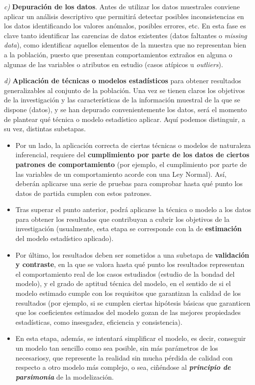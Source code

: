 \documentclass[
]{book}
\begin{document}
\emph{c)} \textbf{Depuración de los datos}. Antes de utilizar los datos muestrales conviene aplicar un análisis descriptivo que permitirá detectar posibles inconsistencias en los datos identificando los valores anómalos, posibles errores, etc. En esta fase es clave tanto identificar las carencias de datos existentes (datos faltantes o \emph{missing data}), como identificar aquellos elementos de la muestra que no representan bien a la población, puesto que presentan comportamientos extraños en alguna o algunas de las variables o atributos en estudio (casos atípicos u \emph{outliers}).

\emph{d)} \textbf{Aplicación de técnicas o modelos estadísticos} para obtener resultados generalizables al conjunto de la población. Una vez se tienen claros los objetivos de la investigación y las características de la información muestral de la que se dispone (datos), y se han depurado convenientemente los datos, será el momento de plantear qué técnica o modelo estadístico aplicar. Aquí podemos distinguir, a su vez, distintas subetapas.

\begin{itemize}
\item
  Por un lado, la aplicación correcta de ciertas técnicas o modelos de naturaleza inferencial, requiere del \textbf{cumplimiento por parte de los datos de ciertos patrones de comportamiento} (por ejemplo, el cumplimiento por parte de las variables de un comportamiento acorde con una Ley Normal). Así, deberán aplicarse una serie de pruebas para comprobar hasta qué punto los datos de partida cumplen con estos patrones.
\item
  Tras superar el punto anterior, podrá aplicarse la técnica o modelo a los datos para obtener los resultados que contribuyan a cubrir los objetivos de la investigación (usualmente, esta etapa se corresponde con la de \textbf{estimación} del modelo estadístico aplicado).
\item
  Por último, los resultados deben ser sometidos a una subetapa de \textbf{validación y contraste}, en la que se valora hasta qué punto los resultados representan el comportamiento real de los casos estudiados (estudio de la bondad del modelo), y el grado de aptitud técnica del modelo, en el sentido de si el modelo estimado cumple con los requisitos que garantizan la calidad de los resultados (por ejemplo, si se cumplen ciertas hipótesis básicas que garanticen que los coeficientes estimados del modelo gozan de las mejores propiedades estadísticas, como insesgadez, eficiencia y consistencia).
\item
  En esta etapa, además, se intentará simplificar el modelo, es decir, conseguir un modelo tan sencillo como sea posible, sin más parámetros de los necesariosy, que represente la realidad sin mucha pérdida de calidad con respecto a otro modelo más complejo, o sea, ciñéndose al \textbf{\emph{principio de parsimonia}} de la modelización.
\end{itemize}
\end{document}
